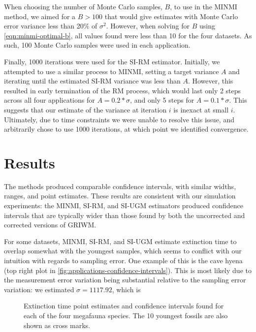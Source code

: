 When choosing the number of Monte Carlo samples, $B$, to use in the MINMI method, we aimed for a $B > 100$ that would give estimates with Monte Carlo error variance less than 20\% of $\sigma^2$. However, when solving for $B$ using \autoref{eqn:minmi-optimal-b}, all values found were less than 10 for the four datasets. As such, 100 Monte Carlo samples were used in each application.

Finally, 1000 iterations were used for the SI-RM estimator. Initially, we attempted to use a similar process to MINMI, setting a target variance $A$ and iterating until the estimated SI-RM variance was less than $A$. However, this resulted in early termination of the RM process, which would last only 2 steps across all four applications for $A  = 0.2*\sigma$, and only 5 steps for $A = 0.1*\sigma$. This suggests that our estimate of the variance at iteration $i$ is inexact at small $i$. Ultimately, due to time constraints we were unable to resolve this issue, and arbitrarily chose to use 1000 iterations, at which point we identified convergence.
\clearpage

\section{Results}

The methods produced comparable confidence intervals, with similar widths, ranges, and point estimates. These results are consistent with our simulation experiments: the MINMI, SI-RM, and SI-UGM estimators produced confidence intervals that are typically wider than those found by both the uncorrected and corrected versions of GRIWM.

For some datasets, MINMI, SI-RM, and SI-UGM estimate extinction time to overlap somewhat with the youngest samples, which seems to conflict with our intuition with regards to sampling error. One example of this is the cave hyena (top right plot in \autoref{fig:applications-confidence-intervals}). This is most likely due to the measurement error variation being substantial relative to the sampling error variation: we estimated $\sigma = 1117.92$, which is 
\begin{figure}[ht]
    \centering
    
    \caption{Extinction time point estimates and confidence intervals found for each of the four megafauna species. The 10 youngest fossils are also shown as cross marks.}
    \label{fig:applications-confidence-intervals}
\end{figure}

